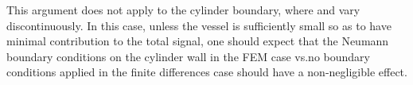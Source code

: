\documentclass[twocolumn,twoside]{article}
\begin{document}
This argument does not apply to the cylinder boundary, where \rr{} and \ww{} vary discontinuously.
In this case, unless the vessel is sufficiently small so as to have minimal contribution to the total signal, one should expect that the Neumann boundary conditions on the cylinder wall in the FEM case vs.\@ no boundary conditions applied in the finite differences case should have a non-negligible effect.


%
%
%
%
%
%
%
\end{document}

